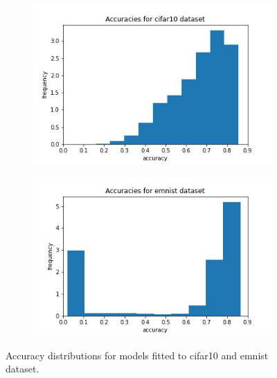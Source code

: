 \documentclass{article} %
\begin{document}
\begin{figure}
    \begin{subfigure}{.5\textwidth}
        \centering
        \includegraphics[width=.8\linewidth]{cifar10/accuracy_distribution.jpg}
        \label{fig:accuracy_distribution_cifar10}
    \end{subfigure}%
    \begin{subfigure}{.5\textwidth}
        \centering
        \includegraphics[width=.8\linewidth]{emnist/accuracy_distribution.jpg}
        \label{fig:accuracy_distribution_emnist}
    \end{subfigure}
    \caption{Accuracy distributions for models fitted to cifar10 and emnist dataset.}
    \label{fig:acc_distributions}
\end{figure}
\end{document}
